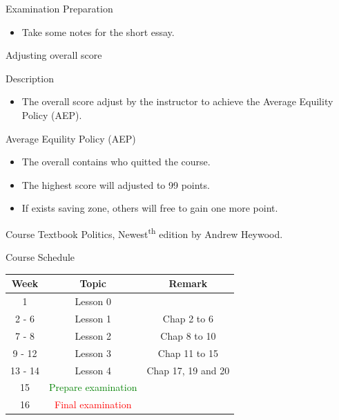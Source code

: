 \documentclass{beamer}
\begin{document}
\begin{frame}{Examination Preparation}
\begin{itemize}
\item Take some notes for the short essay.
\end{itemize}
\end{frame}
\begin{frame}{Adjusting overall score}
\begin{block}{Description}
\begin{itemize}
\item The overall score adjust by the instructor to achieve the Average Equility Policy (AEP).
\end{itemize}
\end{block}
\begin{block}{Average Equility Policy (AEP)}
\begin{itemize}
\item The overall contains who quitted the course.
\item The highest score will adjusted to 99 points.
\item If exists saving zone, others will free to gain one more point.
\end{itemize}
\end{block}
\end{frame}
\begin{frame}{Course Textbook}
Politics, Newest\textsuperscript{th} edition by Andrew Heywood. \\
\end{frame}
\begin{frame}{Course Schedule}
\begin{center}
\begin{tabular}{|c|c|c|}
\hline
Week & Topic & Remark \\
\hline
1 & Lesson 0 & \\
\hline
2 - 6 & Lesson 1 & Chap 2 to 6\\
\hline
7 - 8 & Lesson 2 & Chap 8 to 10\\
\hline
9 - 12 & Lesson 3 & Chap 11 to 15 \\
\hline
13 - 14 & Lesson 4 & Chap 17, 19 and 20 \\
\hline
15 & \textcolor{Green}{Prepare examination} & \\
\hline
16 & \textcolor{red}{Final examination} & \\
\hline
\end{tabular}
\end{center}
\end{frame}
\end{document}
